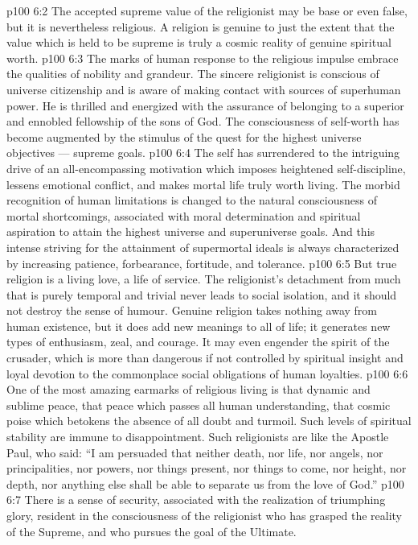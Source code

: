 \vs p100 6:2 The accepted supreme value of the religionist may be base or even false, but it is nevertheless religious. A religion is genuine to just the extent that the value which is held to be supreme is truly a cosmic reality of genuine spiritual worth.
\vs p100 6:3 The marks of human response to the religious impulse embrace the qualities of nobility and grandeur. The sincere religionist is conscious of universe citizenship and is aware of making contact with sources of superhuman power. He is thrilled and energized with the assurance of belonging to a superior and ennobled fellowship of the sons of God. The consciousness of self\hyp{}worth has become augmented by the stimulus of the quest for the highest universe objectives --- supreme goals.
\vs p100 6:4 The self has surrendered to the intriguing drive of an all\hyp{}encompassing motivation which imposes heightened self\hyp{}discipline, lessens emotional conflict, and makes mortal life truly worth living. The morbid recognition of human limitations is changed to the natural consciousness of mortal shortcomings, associated with moral determination and spiritual aspiration to attain the highest universe and superuniverse goals. And this intense striving for the attainment of supermortal ideals is always characterized by increasing patience, forbearance, fortitude, and tolerance.
\vs p100 6:5 But true religion is a living love, a life of service. The religionist’s detachment from much that is purely temporal and trivial never leads to social isolation, and it should not destroy the sense of humour. Genuine religion takes nothing away from human existence, but it does add new meanings to all of life; it generates new types of enthusiasm, zeal, and courage. It may even engender the spirit of the crusader, which is more than dangerous if not controlled by spiritual insight and loyal devotion to the commonplace social obligations of human loyalties.
\vs p100 6:6 \pc One of the most amazing earmarks of religious living is that dynamic and sublime peace, that peace which passes all human understanding, that cosmic poise which betokens the absence of all doubt and turmoil. Such levels of spiritual stability are immune to disappointment. Such religionists are like the Apostle Paul, who said: “I am persuaded that neither death, nor life, nor angels, nor principalities, nor powers, nor things present, nor things to come, nor height, nor depth, nor anything else shall be able to separate us from the love of God.”
\vs p100 6:7 There is a sense of security, associated with the realization of triumphing glory, resident in the consciousness of the religionist who has grasped the reality of the Supreme, and who pursues the goal of the Ultimate.
